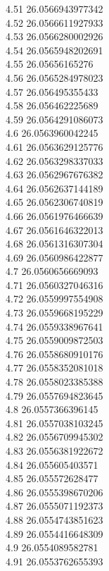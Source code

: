 {4.51	26.0566943977342\\
4.52	26.0566611927933\\
4.53	26.0566280002926\\
4.54	26.0565948202691\\
4.55	26.05656165276\\
4.56	26.0565284978023\\
4.57	26.056495355433\\
4.58	26.056462225689\\
4.59	26.0564291086073\\
4.6	26.0563960042245\\
4.61	26.0563629125776\\
4.62	26.0563298337033\\
4.63	26.0562967676382\\
4.64	26.0562637144189\\
4.65	26.0562306740819\\
4.66	26.0561976466639\\
4.67	26.0561646322013\\
4.68	26.0561316307304\\
4.69	26.0560986422877\\
4.7	26.0560656669093\\
4.71	26.0560327046316\\
4.72	26.0559997554908\\
4.73	26.0559668195229\\
4.74	26.0559338967641\\
4.75	26.0559009872503\\
4.76	26.0558680910176\\
4.77	26.0558352081018\\
4.78	26.0558023385388\\
4.79	26.0557694823645\\
4.8	26.0557366396145\\
4.81	26.0557038103245\\
4.82	26.0556709945302\\
4.83	26.0556381922672\\
4.84	26.055605403571\\
4.85	26.055572628477\\
4.86	26.0555398670206\\
4.87	26.0555071192373\\
4.88	26.0554743851623\\
4.89	26.0554416648309\\
4.9	26.0554089582781\\
4.91	26.0553762655393\\
}
